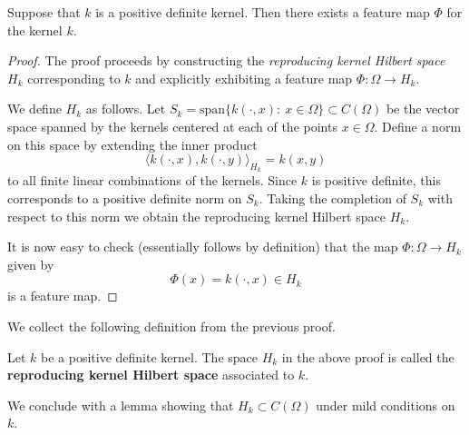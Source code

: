 \begin{theorem}
 Suppose that $k$ is a positive definite kernel. Then there exists a feature map $\Phi$ for the kernel $k$.
\end{theorem}
\begin{proof}
 The proof proceeds by constructing the \textit{reproducing kernel Hilbert space} $H_k$ corresponding to $k$ and explicitly exhibiting a feature map $\Phi:\Omega\rightarrow H_k$.
 
 We define $H_k$ as follows. Let $S_k = \text{span}\{k(\cdot,x):~x\in\Omega\} \subset C(\Omega)$ be the vector space spanned by the kernels centered at each of the points $x\in\Omega$. Define a norm on this space by extending the inner product
 \begin{equation}
  \langle k(\cdot,x), k(\cdot,y)\rangle_{H_k} = k(x,y)
 \end{equation}
 to all finite linear combinations of the kernels. Since $k$ is positive definite, this corresponds to a positive definite norm on $S_k$. Taking the completion of $S_k$ with respect to this norm we obtain the reproducing kernel Hilbert space $H_k$.
 
 It is now easy to check (essentially follows by definition) that the map $\Phi:\Omega\rightarrow H_k$ given by
 \begin{equation}
  \Phi(x) = k(\cdot,x)\in H_k
 \end{equation}
 is a feature map.
 
\end{proof}
We collect the following definition from the previous proof.
\begin{definition}
 Let $k$ be a positive definite kernel. The space $H_k$ in the above proof is called the \textbf{reproducing kernel Hilbert space} associated to $k$. 
\end{definition}

We conclude with a lemma showing that $H_k\subset C(\Omega)$ under mild conditions on $k$.

